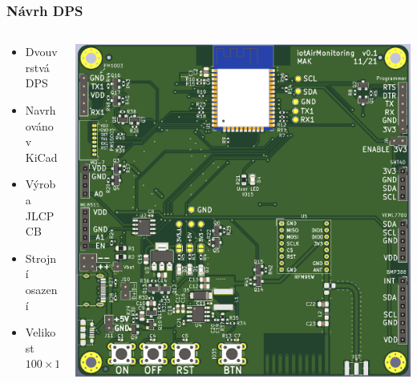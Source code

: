 \documentclass[%
  12pt,       				%
	t,                  %
	aspectratio=1610,   %
	unicode,						%
]{beamer}				    	%
\begin{document}
\begin{frame}
	\frametitle{Návrh DPS}
	\begin{columns}[T]
		\begin{column}{0.4\columnwidth}
			\begin{itemize}
				\item Dvouvrstvá DPS
				\item Navrhováno v KiCad
				\item Výroba JLCPCB
				\item Strojní osazení
				\item Velikost $100\times 100mm$
			\end{itemize}
		\end{column}

		\begin{column}{0.6\columnwidth}
			\centering
			\includegraphics[width=0.85\columnwidth]{obrazky/PCB_top.png}
		\end{column}
	\end{columns}
\end{frame}

\end{document}
